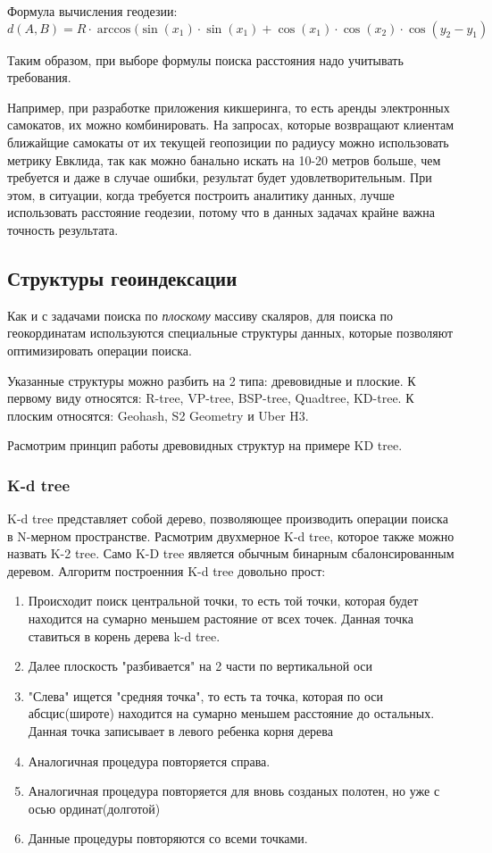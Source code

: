 Формула вычисления геодезии:
$$
d(A, B) = R \cdot \arccos(\sin(x_1) \cdot \sin(x_1) + \cos(x_1) \cdot \cos(x_2) \cdot \cos(y_2 - y_1)
$$

Таким образом, при выборе формулы поиска расстояния надо учитывать требования.

Например, при разработке приложения кикшеринга, то есть аренды электронных самокатов, их можно комбинировать. На запросах, которые возвращают клиентам ближайщие самокаты от их текущей геопозиции по радиусу можно использовать метрику Евклида, так как можно банально искать на 10-20 метров больше, чем требуется и даже в случае ошибки, результат будет удовлетворительным.
При этом, в ситуации, когда требуется построить аналитику данных, лучше использовать расстояние геодезии, потому что в данных задачах крайне важна точность результата.

\subsection{Структуры геоиндексации}
Как и с задачами поиска по \textit{плоскому} массиву скаляров, для поиска по геокординатам используются специальные структуры данных, которые позволяют оптимизировать операции поиска.

Указанные структуры можно разбить на 2 типа: древовидные и плоские. К первому виду относятся: R-tree, VP-tree, BSP-tree, Quadtree, KD-tree. К плоским относятся: Geohash, S2 Geometry и Uber H3.

Расмотрим принцип работы древовидных структур на примере KD tree.

\subsubsection{K-d tree}
K-d tree представляет собой дерево, позволяющее производить операции поиска в N-мерном пространстве. Расмотрим двухмерное K-d tree, которое также можно назвать K-2 tree.
Само K-D tree является обычным бинарным сбалонсированным деревом.
Алгоритм построенния K-d tree довольно прост:
\begin{enumerate}
    \item Происходит поиск центральной точки, то есть той точки, которая будет находится на сумарно меньшем растояние от всех точек. Данная точка ставиться в корень дерева k-d tree.
    \item Далее плоскость "разбивается" на 2 части по вертикальной оси
    \item "Слева" ищется "средняя точка", то есть та точка, которая по оси абсцис(широте) находится на сумарно меньшем расстояние до остальных. Данная точка записывает в левого ребенка корня дерева
    \item Аналогичная процедура повторяется справа.
    \item Аналогичная процедура повторяется для вновь созданых полотен, но уже с осью ординат(долготой)
    \item Данные процедуры повторяются со всеми точками.
\end{enumerate}

